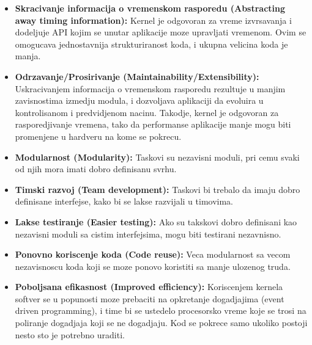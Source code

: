 \documentclass[a4paper,12pt, master]{etf}
\begin{document}
	\begin{itemize}
		\item \textbf{Skracivanje informacija o vremenskom rasporedu (Abstracting away timing 
		information):} Kernel je odgovoran za vreme izvrsavanja i dodeljuje API kojim se 
		unutar aplikacije moze upravljati vremenom. Ovim se omogucava jednostavnija 
		strukturiranost koda, i ukupna velicina koda je manja.
		\item \textbf{Odrzavanje/Prosirivanje (Maintainability/Extensibility):}
		Uskracivanjem informacija o vremenskom rasporedu rezultuje u manjim zavisnostima 
		izmedju	modula, i dozvoljava aplikaciji da evoluira u kontrolisanom i predvidjenom 
		nacinu. Takodje, kernel je odgovoran za rasporedjivanje vremena, tako da performanse 
		aplikacije manje mogu biti promenjene u hardveru na kome se pokrecu.
		\item \textbf{Modularnost (Modularity):}
		Taskovi su nezavisni moduli, pri cemu svaki od njih mora imati dobro definisanu svrhu.
		\item \textbf{Timski razvoj (Team development):}
		Taskovi bi trebalo da imaju dobro definisane interfejse, kako bi se lakse razvijali u
		timovima.
		\item \textbf{Lakse testiranje (Easier testing):}
		Ako su takskovi dobro definisani kao nezavisni moduli sa cistim interfejsima, mogu biti
		testirani nezavnisno.
		\item \textbf{Ponovno koriscenje koda (Code reuse):}
		Veca modularnost sa vecom nezavisnoscu koda koji se moze ponovo koristiti sa manje 
		ulozenog truda.
		\item \textbf{Poboljsana efikasnost (Improved efficiency):}
		Koriscenjem kernela softver se u popunosti moze prebaciti na opkretanje dogadjajima 
		(event driven programming), i time bi se ustedelo procesorsko vreme koje se trosi na 
		poliranje dogadjaja koji se ne dogadjaju. Kod se pokrece samo ukoliko postoji nesto 
		sto je potrebno	uraditi.


\end{itemize}
\end{document}
